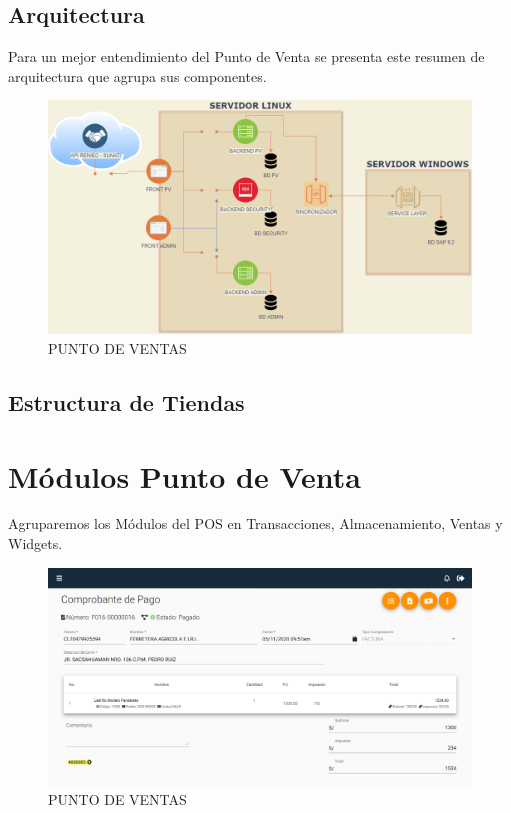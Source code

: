 \documentclass[pdftex,12pt,oneside,a4paper,spanish, english, brazil]{abntex2}
\begin{document}
\begin{sloppypar}
            \section{Arquitectura}
            Para un mejor entendimiento del Punto de Venta se presenta este resumen de arquitectura que agrupa sus componentes.
            \begin{figure}[h!]
            	\centering
            	\caption{PUNTO DE VENTAS} \label{fig:maia}
            	\includegraphics[width=1\linewidth,frame=0.5pt 5pt]{img/ARQ}
            \end{figure}
            \section{Estructura de Tiendas}
           
            
            \chapter{Módulos Punto de Venta}
           	Agruparemos los Módulos del POS en Transacciones, Almacenamiento, Ventas y Widgets.
           	     \begin{figure}[h!]
           		\centering
           		\caption{PUNTO DE VENTAS} \label{fig:maia}
           		\includegraphics[width=0.6\linewidth,frame=0.5pt 5pt]{img/PV}
           	\end{figure}

\end{sloppypar}
\end{document}
